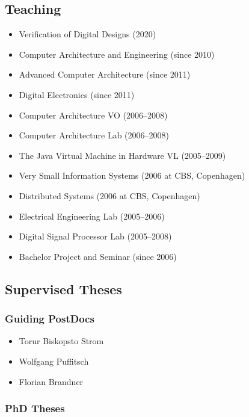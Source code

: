 \documentclass[%
    a4paper,
    11pt, %
    headinclude, footexclude,
    notitlepage,
    headsepline,
    pointlessnumbers,
    ]{scrartcl}
\begin{document}
\subsection*{Teaching}

\begin{itemize}
  \item Verification of Digital Designs (2020)
  \item Computer Architecture and Engineering (since 2010)
  \item Advanced Computer Architecture (since 2011)
  \item Digital Electronics (since 2011)
  \item Computer Architecture VO (2006--2008)
  \item Computer Architecture Lab (2006--2008)
  \item The Java Virtual Machine in Hardware VL (2005--2009)
  \item Very Small Information Systems (2006 at CBS, Copenhagen)
  \item Distributed Systems (2006 at CBS, Copenhagen)
  \item Electrical Engineering Lab (2005--2006)
  \item Digital Signal Processor Lab (2005--2008)
  \item Bachelor Project and Seminar (since 2006)
\end{itemize}

\subsection*{Supervised Theses}

\subsubsection*{Guiding PostDocs}

\begin{itemize}
  \item Torur Biskopsto Strom
  \item Wolfgang Puffitsch
  \item Florian Brandner
\end{itemize}


\subsubsection*{PhD Theses}
\end{document}
